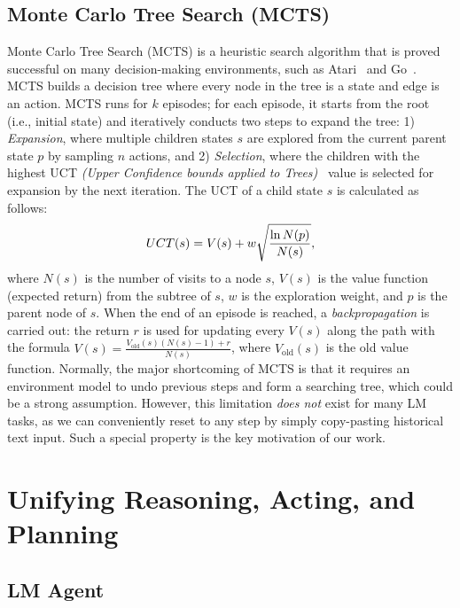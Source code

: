 \documentclass{article}
\newcommand{\yxw}[1]{\textcolor{blue}{[{\bf yxw:} #1]}}
\newcommand{\kai}[1]{\textcolor{purple}{[{\bf kai:} #1]}}
\theoremstyle{plain}
\theoremstyle{definition}
\theoremstyle{remark}
\begin{document}
\subsection{Monte Carlo Tree Search (MCTS)}
Monte Carlo Tree Search (MCTS) is a heuristic search algorithm that is proved successful on many decision-making environments, such as Atari~\citep{ye2021mastering} and Go~\citep{silver2016mastering}. MCTS builds a decision tree where every node in the tree is a state and edge is an action. MCTS runs for $k$ episodes; for each episode, it starts from the root (i.e., initial state) and iteratively conducts two steps to expand the tree: 1) \textit{Expansion}, where multiple children states $s$ are explored from the current parent state $p$ by sampling $n$ actions, and 2) \textit{Selection}, where the children with the highest UCT \textit{(Upper Confidence bounds applied to Trees)}~\citep{kocsis2006bandit} value is selected for expansion by the next iteration. The UCT of a child state $s$ is calculated as follows:
\begin{equation}
\small
UCT(s)=V(s)+w\sqrt{\frac{\ln N(p)}{N(s)}},
\label{eq:uct}
\end{equation}
where $N(s)$ is the number of visits to a node $s$, $V(s)$ is the value function (expected return) from the subtree of $s$, $w$ is the exploration weight, and $p$ is the parent node of $s$. When the end of an episode is reached, a \textit{backpropagation} is carried out: the return $r$ is used for updating every $V(s)$ along the path 
with the formula $V(s)=\frac{V_{\text{old}}(s)(N(s)-1)+r}{N(s)}$, where $V_{\text{old}}(s)$ is the old value function. Normally, the major shortcoming of MCTS is that it requires an environment model to undo previous steps and form a searching tree, which could be a strong assumption. However, this limitation \emph{does not} exist for many LM tasks, as we can conveniently reset to any step by simply copy-pasting historical text input. Such a special property is the key motivation of our work. 


\section{Unifying Reasoning, Acting, and Planning}
\subsection{LM Agent} 
\end{document}
